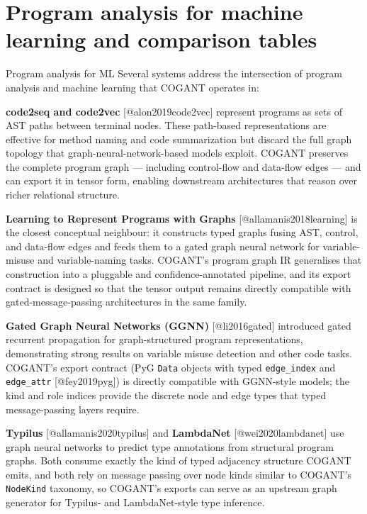 \documentclass[
  ignorenonframetext,
]{beamer}
\author{\texorpdfstring{}{}}
\date{}
\begin{document}
\section{Program analysis for machine learning and comparison
tables}\label{program-analysis-for-machine-learning-and-comparison-tables}

\begin{frame}[fragile]{Program analysis for ML}
\protect{}\label{program-analysis-for-ml}
Several systems address the intersection of program analysis and machine
learning that COGANT operates in:

\textbf{code2seq and code2vec} {[}@alon2019code2vec{]} represent
programs as sets of AST paths between terminal nodes. These path-based
representations are effective for method naming and code summarization
but discard the full graph topology that graph-neural-network-based
models exploit. COGANT preserves the complete program graph ---
including control-flow and data-flow edges --- and can export it in
tensor form, enabling downstream architectures that reason over richer
relational structure.

\textbf{Learning to Represent Programs with Graphs}
{[}@allamanis2018learning{]} is the closest conceptual neighbour: it
constructs typed graphs fusing AST, control, and data-flow edges and
feeds them to a gated graph neural network for variable-misuse and
variable-naming tasks. COGANT's program graph IR generalises that
construction into a pluggable and confidence-annotated pipeline, and its
export contract is designed so that the tensor output remains directly
compatible with gated-message-passing architectures in the same family.

\textbf{Gated Graph Neural Networks (GGNN)} {[}@li2016gated{]}
introduced gated recurrent propagation for graph-structured program
representations, demonstrating strong results on variable misuse
detection and other code tasks. COGANT's export contract (PyG
\texttt{Data} objects with typed \texttt{edge\_index} and
\texttt{edge\_attr} {[}@fey2019pyg{]}) is directly compatible with
GGNN-style models; the kind and role indices provide the discrete node
and edge types that typed message-passing layers require.

\textbf{Typilus} {[}@allamanis2020typilus{]} and \textbf{LambdaNet}
{[}@wei2020lambdanet{]} use graph neural networks to predict type
annotations from structural program graphs. Both consume exactly the
kind of typed adjacency structure COGANT emits, and both rely on message
passing over node kinds similar to COGANT's \texttt{NodeKind} taxonomy,
so COGANT's exports can serve as an upstream graph generator for
Typilus- and LambdaNet-style type inference.


\end{frame}
\end{document}
